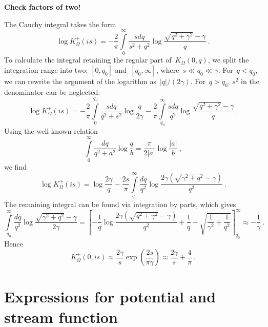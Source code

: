 \documentclass[preprint,aps,eqsecnum, prb]{revtex4-1}
\newcommand{\fplus}[1]{{#1}^{+}}
\begin{document}
\textbf{Check factors of two!}

The Cauchy
integral takes the form
\begin{equation}
  \log\fplus{K}_\Omega(is) = - \frac{2}{\pi}\int\limits_{0}^{\infty}
  \frac{s dq}{s^2 + q^2}
  \log\frac{\sqrt{q^2 + \gamma^2} - \gamma}{q}
  \ .
\end{equation}
To calculate the integral retaining the regular part of~$K_\Omega(0, q)$,
we split the integration range into two: $[0, q_0]$ and~$[q_0, \infty]$,
where~$s \ll q_0 \ll \gamma$. For~$q <  q_0$, we can
rewrite the argument of the logarithm as~$|q|/(2\gamma)$. For~$q > q_0$,
$s^2$ in the denominator can be neglected:
\begin{equation}
  \log\fplus{K}_\Omega(is) = - \frac{2}{\pi}
  \int\limits_{0}^{q_0} \frac{s dq}{q^2 + s^2} \log\frac{q}{2\gamma}
  - \frac{2}{\pi} \int\limits_{q_0}^{\infty}
  \frac{s dq}{q^2} \log\frac{\sqrt{q^2 + \gamma^2} - \gamma}{q}
  \ .
\end{equation}
Using the well-known relation\cite{bib:Gradstein}
\begin{equation}
  \int\limits_{0}^{\infty} \frac{dq}{q^2 + a^2} \log\frac{q}{b}
  = \frac{\pi}{2|a|} \log\frac{|a|}{b}
  \ ,
\end{equation}
we find
\begin{equation}
  \log\fplus{K}_\Omega(is) = \log\frac{2\gamma}{q}
  - \frac{2s}{\pi} \int\limits_{q_0}^{\infty}
  \frac{dq}{q^2} \log\frac{2\gamma\left(\sqrt{\gamma^2 + q^2}  - \gamma\right)}{q^2}
  \ .
\end{equation}
The remaining integral can be found via integration by parts,
which gives
\begin{equation}
  \int\limits_{q_0}^{\infty}
  \frac{dq}{q^2} \log\frac{\sqrt{\gamma^2 + q^2}  - \gamma}{2\gamma}
  = \left[-\frac{1}{q}\log\frac{2\gamma \left(\sqrt{q^2 + \gamma^2} - \gamma\right)}{q^2}
  + \frac{1}{q} - \sqrt{\frac{1}{\gamma^2} + \frac{1}{q^2}} \right]_{q_0}^{\infty}
\approx - \frac{1}{\gamma}
\ .
\end{equation}
Hence
\begin{equation}
  \fplus{K}_\Omega(0, is)
  \approx \frac{2\gamma}{s} \exp\left(\frac{2s}{\pi \gamma}\right)
  \approx \frac{2\gamma}{s} + \frac{4}{\pi}
 \ .
\end{equation}

\section{Expressions for potential and stream function}
\label{sec:app-poles-and-cuts}
\end{document}
